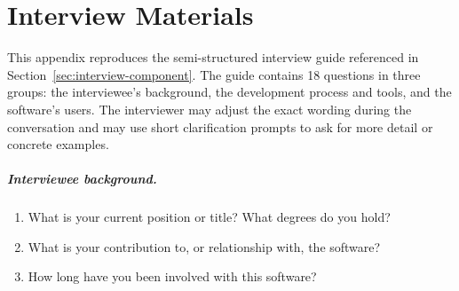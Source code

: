 \chapter{Interview Materials}
\label{appendix:interview-materials}


This appendix reproduces the semi-structured interview guide referenced in Section~\ref{sec:interview-component}. The guide contains 18 questions in three groups: the interviewee's background, the development process and tools, and the software's users. The interviewer may adjust the exact wording during the conversation and may use short clarification prompts to ask for more detail or concrete examples.

\paragraph{Interviewee background.}
\begin{enumerate}
    \item What is your current position or title? What degrees do you hold?
    \item What is your contribution to, or relationship with, the software?
    \item How long have you been involved with this software?
\end{enumerate}

